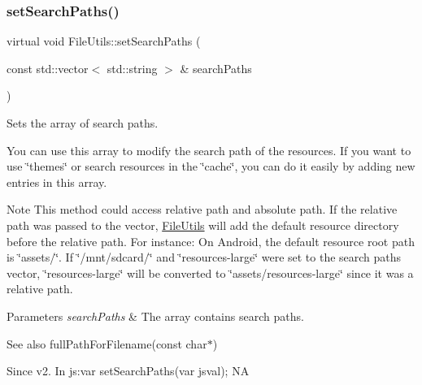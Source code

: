 \subsubsection{\texorpdfstring{set\+Search\+Paths()}{setSearchPaths()}\hspace{0.1cm}{\footnotesize\ttfamily [2/2]}}
{\footnotesize\ttfamily virtual void File\+Utils\+::set\+Search\+Paths (\begin{DoxyParamCaption}\item[{const std\+::vector$<$ std\+::string $>$ \&}]{search\+Paths }\end{DoxyParamCaption})\hspace{0.3cm}{\ttfamily [virtual]}}

Sets the array of search paths.

You can use this array to modify the search path of the resources. If you want to use \char`\"{}themes\char`\"{} or search resources in the \char`\"{}cache\char`\"{}, you can do it easily by adding new entries in this array.

\begin{DoxyNote}{Note}
This method could access relative path and absolute path. If the relative path was passed to the vector, \hyperlink{classFileUtils}{File\+Utils} will add the default resource directory before the relative path. For instance\+: On Android, the default resource root path is \char`\"{}assets/\char`\"{}. If \char`\"{}/mnt/sdcard/\char`\"{} and \char`\"{}resources-\/large\char`\"{} were set to the search paths vector, \char`\"{}resources-\/large\char`\"{} will be converted to \char`\"{}assets/resources-\/large\char`\"{} since it was a relative path.
\end{DoxyNote}

\begin{DoxyParams}{Parameters}
{\em search\+Paths} & The array contains search paths. \\
\hline
\end{DoxyParams}
\begin{DoxySeeAlso}{See also}
full\+Path\+For\+Filename(const char$\ast$) 
\end{DoxySeeAlso}
\begin{DoxySince}{Since}
v2. In js\+:var set\+Search\+Paths(var jsval);  NA 
\end{DoxySince}
\mbox{\label{classFileUtils_ac99445fa3112510c8f019c9f38a4779f}} 
